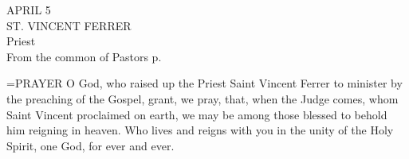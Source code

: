 \begin{center}\normalsize APRIL 5\\
\footnotesize ST. VINCENT FERRER\\
\footnotesize Priest\\
\footnotesize From the common of Pastors p. \\
\end{center}

\hangindent=\parindent \small{PRAYER 
O God, who raised up the Priest Saint Vincent Ferrer
to minister by the preaching of the Gospel,
grant, we pray,
that, when the Judge comes,
whom Saint Vincent proclaimed on earth,
we may be among those blessed
to behold him reigning in heaven.
Who lives and reigns with you in the unity of the Holy Spirit,
one God, for ever and ever.\\}
 
